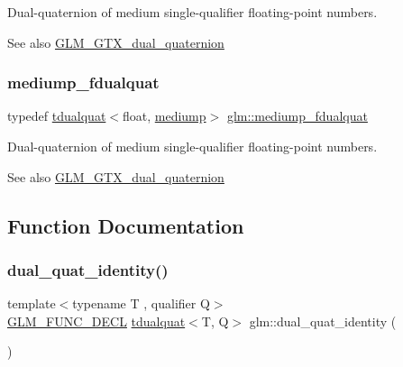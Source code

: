 Dual-\/quaternion of medium single-\/qualifier floating-\/point numbers.

\begin{DoxySeeAlso}{See also}
\mbox{\hyperlink{group__gtx__dual__quaternion}{G\+L\+M\+\_\+\+G\+T\+X\+\_\+dual\+\_\+quaternion}} 
\end{DoxySeeAlso}
\mbox{\label{group__gtx__dual__quaternion_ga93e9def86ffeedd48d9c79a6afacfa6c}} 
\subsubsection{\texorpdfstring{mediump\+\_\+fdualquat}{mediump\_fdualquat}}
{\footnotesize\ttfamily typedef \mbox{\hyperlink{structglm_1_1tdualquat}{tdualquat}}$<$float, \mbox{\hyperlink{namespaceglm_a36ed105b07c7746804d7fdc7cc90ff25a6416f3ea0c9025fb21ed50c4d6620482}{mediump}}$>$ \mbox{\hyperlink{group__gtx__dual__quaternion_ga93e9def86ffeedd48d9c79a6afacfa6c}{glm\+::mediump\+\_\+fdualquat}}}

Dual-\/quaternion of medium single-\/qualifier floating-\/point numbers.

\begin{DoxySeeAlso}{See also}
\mbox{\hyperlink{group__gtx__dual__quaternion}{G\+L\+M\+\_\+\+G\+T\+X\+\_\+dual\+\_\+quaternion}} 
\end{DoxySeeAlso}


\subsection{Function Documentation}
\mbox{\label{group__gtx__dual__quaternion_ga0b35c0e30df8a875dbaa751e0bd800e0}} 
\subsubsection{\texorpdfstring{dual\+\_\+quat\+\_\+identity()}{dual\_quat\_identity()}}
{\footnotesize\ttfamily template$<$typename T , qualifier Q$>$ \\
\mbox{\hyperlink{setup_8hpp_ab2d052de21a70539923e9bcbf6e83a51}{G\+L\+M\+\_\+\+F\+U\+N\+C\+\_\+\+D\+E\+CL}} \mbox{\hyperlink{structglm_1_1tdualquat}{tdualquat}}$<$T, Q$>$ glm\+::dual\+\_\+quat\+\_\+identity (\begin{DoxyParamCaption}{ }\end{DoxyParamCaption})}

